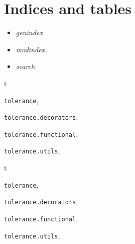 \documentclass[letterpaper,10pt,english]{sphinxmanual}
\begin{document}
\chapter{Indices and tables}
\label{index:indices-and-tables}\begin{itemize}
\item {} 
\emph{genindex}

\item {} 
\emph{modindex}

\item {} 
\emph{search}

\end{itemize}


\renewcommand{\indexname}{Python Module Index}
\begin{theindex}
\def\bigletter#1{{\Large\sffamily#1}\nopagebreak\vspace{1mm}}
\bigletter{t}
\item {\texttt{tolerance}}, \pageref{tolerance:module-tolerance}
\item {\texttt{tolerance.decorators}}, \pageref{tolerance:module-tolerance.decorators}
\item {\texttt{tolerance.functional}}, \pageref{tolerance:module-tolerance.functional}
\item {\texttt{tolerance.utils}}, \pageref{tolerance:module-tolerance.utils}
\end{theindex}
\renewcommand{\indexname}{Python Module Index}
\begin{theindex}
\def\bigletter#1{{\Large\sffamily#1}\nopagebreak\vspace{1mm}}
\bigletter{t}
\item {\texttt{tolerance}}, \pageref{tolerance:module-tolerance}
\item {\texttt{tolerance.decorators}}, \pageref{tolerance:module-tolerance.decorators}
\item {\texttt{tolerance.functional}}, \pageref{tolerance:module-tolerance.functional}
\item {\texttt{tolerance.utils}}, \pageref{tolerance:module-tolerance.utils}
\end{theindex}

\renewcommand{\indexname}{Index}
\printindex
\end{document}
